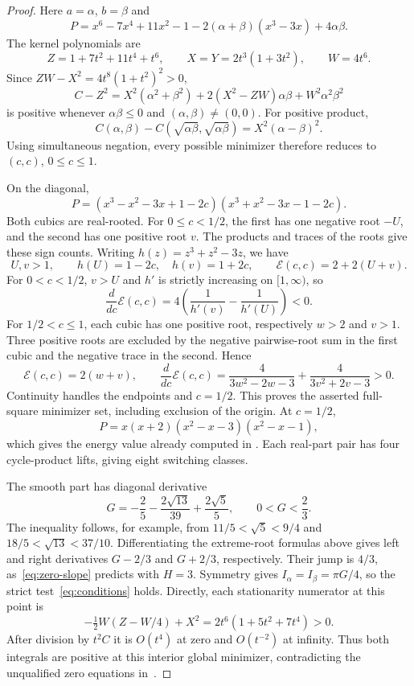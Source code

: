 \documentclass[11pt,a4paper]{article}
\theoremstyle{remark}
\newcommand{\E}{\mathcal E}
\begin{document}
\begin{proof}
Here $a=\alpha$, $b=\beta$ and
\[
 P=x^6-7x^4+11x^2-1-2(\alpha+\beta)(x^3-3x)+4\alpha\beta.
\]
The kernel polynomials are
\[
 Z=1+7t^2+11t^4+t^6,\qquad
 X=Y=2t^3(1+3t^2),\qquad W=4t^6.
\]
Since $ZW-X^2=4t^8(1+t^2)^2>0$,
\[
 C-Z^2=X^2(\alpha^2+\beta^2)
          +2(X^2-ZW)\alpha\beta+W^2\alpha^2\beta^2
\]
is positive whenever $\alpha\beta\leq0$ and
$(\alpha,\beta)\ne(0,0)$. For positive product,
\[
 C(\alpha,\beta)-C(\sqrt{\alpha\beta},\sqrt{\alpha\beta})
      =X^2(\alpha-\beta)^2.
\]
Using simultaneous negation, every possible minimizer therefore
reduces to $(c,c)$, $0\leq c\leq1$.

On the diagonal,
\begin{equation}\label{eq:331-factors}
 P=(x^3-x^2-3x+1-2c)(x^3+x^2-3x-1-2c).
\end{equation}
Both cubics are real-rooted. For $0\leq c<1/2$, the first has one
negative root $-U$, and the second has one positive root $v$.
The products and traces of the roots give these sign counts.
Writing $h(z)=z^3+z^2-3z$, we have
\[
 U,v>1,\qquad h(U)=1-2c,\quad h(v)=1+2c,\qquad
 \E(c,c)=2+2(U+v).
\]
For $0<c<1/2$, $v>U$ and $h'$ is strictly increasing on $[1,\infty)$,
so
\[
 \frac{d}{dc}\E(c,c)
       =4\left(\frac1{h'(v)}-\frac1{h'(U)}\right)<0.
\]
For $1/2<c\leq1$, each cubic has one positive root, respectively
$w>2$ and $v>1$. Three positive roots are excluded by the negative
pairwise-root sum in the first cubic and the negative trace in
the second. Hence
\[
 \E(c,c)=2(w+v),\qquad
 \frac{d}{dc}\E(c,c)=\frac4{3w^2-2w-3}
                         +\frac4{3v^2+2v-3}>0.
\]
Continuity handles the endpoints and $c=1/2$. This proves the
asserted full-square minimizer set, including exclusion of the origin.
At $c=1/2$,
\[
 P=x(x+2)(x^2-x-3)(x^2-x-1),
\]
which gives the energy value already computed in
\cite[Proposition 4.9]{HuangPereyra2026}.
Each real-part pair has four cycle-product lifts, giving eight
switching classes.

The smooth part has diagonal derivative
\[
 G=-\frac25-\frac{2\sqrt{13}}{39}+\frac{2\sqrt5}{5},
       \qquad 0<G<\frac23 .
\]
The inequality follows, for example, from
$11/5<\sqrt5<9/4$ and $18/5<\sqrt{13}<37/10$.
Differentiating the extreme-root formulas above gives left and
right derivatives $G-2/3$ and $G+2/3$, respectively.
Their jump is $4/3$, as~\eqref{eq:zero-slope} predicts with $H=3$.
Symmetry gives $I_\alpha=I_\beta=\pi G/4$, so the strict
test~\eqref{eq:conditions} holds.
Directly, each stationarity numerator at this point is
\[
 -\tfrac12W(Z-W/4)+X^2
       =2t^6(1+5t^2+7t^4)>0.
\]
After division by $t^2C$ it is $O(t^4)$ at zero and $O(t^{-2})$
at infinity. Thus both integrals are positive at this interior
global minimizer, contradicting the unqualified zero equations
in~\cite[Theorem 4.7, equation (117)]{HuangPereyra2026}.
\end{proof}
\end{document}
